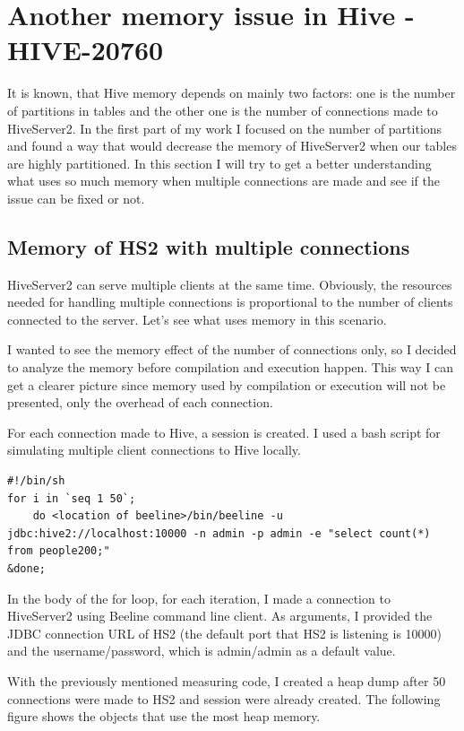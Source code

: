 \chapter{Another memory issue in Hive - HIVE-20760}
It is known, that Hive memory depends on mainly two factors: one is the number of partitions in tables and the other one is the number of connections made to HiveServer2. In the first part of my work I focused on the number of partitions and found a way that would decrease the memory of HiveServer2 when our tables are highly partitioned. In this section I will try to get a better understanding what uses so much memory when multiple connections are made and see if the issue can be fixed or not. 

\section{Memory of HS2 with multiple connections}
HiveServer2 can serve multiple clients at the same time. Obviously, the resources needed for handling multiple connections is proportional to the number of clients connected to the server. Let's see what uses memory in this scenario.

I wanted to see the memory effect of the number of connections only, so I decided to analyze the memory before compilation and execution happen. This way I can get a clearer picture since memory used by compilation or execution will not be presented, only the overhead of each connection. 

For each connection made to Hive, a session is created. I used a bash script for simulating multiple client connections to Hive locally. 

\begin{lstlisting}
#!/bin/sh
for i in `seq 1 50`; 
	do <location of beeline>/bin/beeline -u jdbc:hive2://localhost:10000 -n admin -p admin -e "select count(*) from people200;" 
&done;	
\end{lstlisting}

In the body of the for loop, for each iteration, I made a connection to HiveServer2 using Beeline command line client. As arguments, I provided the JDBC connection URL of HS2 (the default port that HS2 is listening is 10000) and the username/password, which is admin/admin as a default value.

With the previously mentioned measuring code, I created a heap dump after 50 connections were made to HS2 and session were already created. The following figure shows the objects that use the most heap memory.

